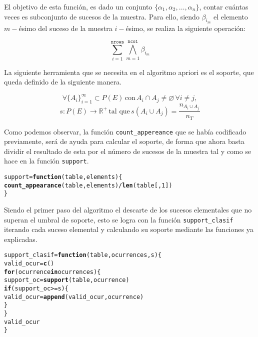 \documentclass[12pt]{report}\usepackage[]{graphicx}\usepackage[dvipsnames]{xcolor}
\makeatletter
\newcommand{\hlnum}[1]{\textcolor[rgb]{0.686,0.059,0.569}{#1}}%
\newcommand{\hlopt}[1]{\textcolor[rgb]{0,0,0}{#1}}%
\newcommand{\hlstd}[1]{\textcolor[rgb]{0.345,0.345,0.345}{#1}}%
\newcommand{\hlkwa}[1]{\textcolor[rgb]{0.161,0.373,0.58}{\textbf{#1}}}%
\newcommand{\hlkwb}[1]{\textcolor[rgb]{0.69,0.353,0.396}{#1}}%
\newcommand{\hlkwc}[1]{\textcolor[rgb]{0.333,0.667,0.333}{#1}}%
\newcommand{\hlkwd}[1]{\textcolor[rgb]{0.737,0.353,0.396}{\textbf{#1}}}%
\newenvironment{kframe}{%
 \def\at@end@of@kframe{}%
 \ifinner\ifhmode%
  \def\at@end@of@kframe{\end{minipage}}%
  \begin{minipage}{\columnwidth}%
 \fi\fi%
 \def\FrameCommand##1{\hskip\@totalleftmargin \hskip-\fboxsep
 \colorbox{shadecolor}{##1}\hskip-\fboxsep
     \hskip-\linewidth \hskip-\@totalleftmargin \hskip\columnwidth}%
 \MakeFramed {\advance\hsize-\width
   \@totalleftmargin\z@ \linewidth\hsize
   \@setminipage}}%
 {\par\unskip\endMakeFramed%
 \at@end@of@kframe}
\newenvironment{knitrout}{}{} %
\makeatother
\begin{document}
			El objetivo de esta función, es dado un conjunto $\{\alpha_1, \alpha_2, \ldots, \alpha_n\}$, contar cuántas veces es subconjunto de sucesos de la muestra. Para ello, siendo $\beta_{i_m}$ el elemento $m-$ésimo del suceso de la muestra $i-$ésimo, se realiza la siguiente operación: 
			
			$$
			\sum_{i=1}^\texttt{nrows}\bigwedge_{m=1}^\texttt{ncol}\beta_{i_m}
			$$
			
			La siguiente herramienta que se necesita en el algoritmo apriori es el soporte, que queda definido de la siguiente manera. 
			
			$$
			\forall\{A_i\}_{i=1}^\infty \subset P(E) \, \text{con} \, A_i \cap A_j \neq \varnothing \, \forall i \neq j,
			$$
			$$
			s: P(E) \longrightarrow \mathbb{R}^+ \, \text{tal} \,\, \text{que} \, s(A_i \cup A_j) = \frac{n_{A_i \cup A_j}}{n_T}
			$$
			
			Como podemos observar, la función \texttt{count\_appereance} que se había codificado previamente, será de ayuda para calcular el soporte, de forma que ahora basta dividir el resultado de esta por el número de sucesos de la muestra tal y como se hace en la función \texttt{support}. 
			
\begin{knitrout}
\color{fgcolor}\begin{kframe}
\begin{alltt}
\hlstd{support} \hlkwb{=} \hlkwa{function}\hlstd{(}\hlkwc{table}\hlstd{,} \hlkwc{elements}\hlstd{) \{}
        \hlkwd{count_appearance}\hlstd{(table, elements)} \hlopt{/} \hlkwd{len}\hlstd{(table[,}\hlnum{1}\hlstd{])}
\hlstd{\}}
\end{alltt}
\end{kframe}
\end{knitrout}
			
			Siendo el primer paso del algoritmo el descarte de los sucesos elementales que no superan el umbral de soporte, esto se logra con la función \texttt{support\_clasif} iterando cada suceso elemental y calculando su soporte mediante las funciones ya explicadas. 
			
\begin{knitrout}
\color{fgcolor}\begin{kframe}
\begin{alltt}
\hlstd{support_clasif} \hlkwb{=} \hlkwa{function}\hlstd{(}\hlkwc{table}\hlstd{,} \hlkwc{ocurrences}\hlstd{,} \hlkwc{s}\hlstd{) \{}
        \hlstd{valid_ocur} \hlkwb{=} \hlkwd{c}\hlstd{()}
        \hlkwa{for} \hlstd{(ocurrence} \hlkwa{in} \hlstd{ocurrences) \{}
                \hlstd{support_oc} \hlkwb{=} \hlkwd{support}\hlstd{(table, ocurrence)}
                \hlkwa{if} \hlstd{(support_oc} \hlopt{>=} \hlstd{s) \{}
                        \hlstd{valid_ocur} \hlkwb{=} \hlkwd{append}\hlstd{(valid_ocur, ocurrence)}
                \hlstd{\}}
        \hlstd{\}}
        \hlstd{valid_ocur}
\hlstd{\}}
\end{alltt}
\end{kframe}
\end{knitrout}
			
\end{document}

